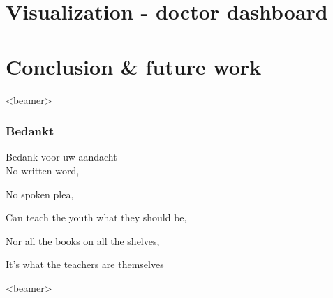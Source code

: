\documentclass[english]{beamer}
\begin{document}
\section{Visualization - doctor dashboard}
\section{Conclusion \& future work}






\begin{frame}<beamer> 
  \frametitle{Bedankt}
	  {\huge \color{ugentyellow} Bedank voor uw aandacht}\\
	  No written word,
	  
	  No spoken plea,
	  
	  Can teach the youth what they should be,
	  
	  Nor all the books on all the shelves,
	  
	  It's what the teachers are themselves 
\end{frame}

\begin{frame}<beamer> 
	\small
	\tableofcontents
\end{frame}
\end{document}
